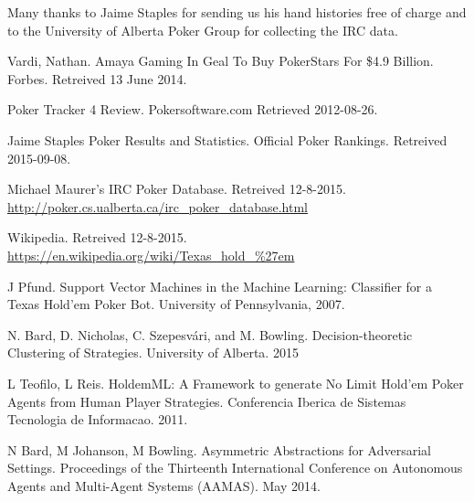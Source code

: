 \documentclass[twoside]{article}
\begin{document}
\begin{multicols}{2}
Many thanks to Jaime Staples for sending us his hand histories free of charge and to the University of Alberta Poker Group for collecting the IRC data. 



\begin{thebibliography}{99} %

 Vardi, Nathan. Amaya Gaming In Geal To Buy PokerStars For \$4.9 Billion. Forbes. Retreived 13 June 2014. 

 Poker Tracker 4 Review. Pokersoftware.com Retrieved 2012-08-26.

 Jaime Staples Poker Results and Statistics. Official Poker Rankings. Retreived 2015-09-08.

 Michael Maurer's IRC Poker Database. Retreived 12-8-2015.
\url{http://poker.cs.ualberta.ca/irc_poker_database.html}

 Wikipedia. Retreived 12-8-2015.
\url{https://en.wikipedia.org/wiki/Texas_hold_%27em}

 J Pfund. Support Vector Machines in the Machine Learning: Classifier for a Texas Hold'em Poker Bot.  University of Pennsylvania, 2007.

 N. Bard, D. Nicholas, C. Szepesvári, and M. Bowling. Decision-theoretic Clustering of Strategies. University of Alberta. 2015

 L Teofilo, L Reis. HoldemML: A Framework to generate No Limit Hold’em Poker Agents from Human Player Strategies. Conferencia Iberica de Sistemas Tecnologia de Informacao. 2011.

 N Bard, M Johanson, M Bowling. Asymmetric Abstractions for Adversarial Settings. Proceedings of the Thirteenth International Conference on Autonomous Agents and Multi-Agent Systems (AAMAS). May 2014.
\end{thebibliography}


\end{multicols}
\end{document}
